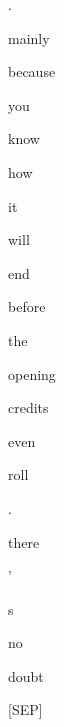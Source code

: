 \documentclass[varwidth=150mm]{standalone}
\begin{document}
\begin{CJK*}{UTF8}{gbsn}
{{{\colorbox{red!17.75214385986328}{\strut .} \colorbox{red!4.8224406242370605}{\strut mainly} \colorbox{red!2.124915361404419}{\strut because} \colorbox{red!2.487790107727051}{\strut you} \colorbox{red!0.0}{\strut know} \colorbox{red!2.1926357746124268}{\strut how} \colorbox{red!4.420445442199707}{\strut it} \colorbox{red!7.614052772521973}{\strut will} \colorbox{red!3.9356584548950195}{\strut end} \colorbox{red!0.0}{\strut before} \colorbox{red!5.0072550773620605}{\strut the} \colorbox{red!5.14437198638916}{\strut opening} \colorbox{red!9.540857315063477}{\strut credits} \colorbox{red!1.5277628898620605}{\strut even} \colorbox{red!1.7686281204223633}{\strut roll} \colorbox{red!0.0}{\strut .} \colorbox{red!0.0}{\strut there} \colorbox{red!3.3755805492401123}{\strut '} \colorbox{red!16.639453887939453}{\strut s} \colorbox{red!1.7105351686477661}{\strut no} \colorbox{red!0.0}{\strut doubt} \colorbox{red!1.106689691543579}{\strut [SEP]}
}}}
\end{CJK*}
\end{document}
